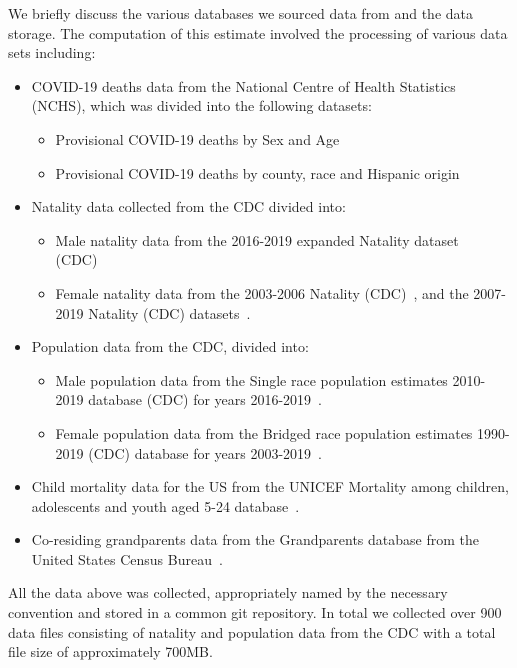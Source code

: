 \documentclass[11pt]{article}
\begin{document}
We briefly discuss the various databases we sourced data from and the data storage. The computation of this estimate involved the processing of various data sets including:
\begin{itemize}
    \item COVID-19 deaths data from the National Centre of Health Statistics (NCHS), which was divided into the following datasets:
    \begin{itemize}
        \item Provisional COVID-19 deaths by Sex and Age~\cite{COVID_19_Deaths_by_sex_and_age}
        \item Provisional COVID-19 deaths by county, race and Hispanic origin~\cite{COVID_19_Deaths_by_county_and_race}
    \end{itemize}
    \item Natality data collected from the CDC divided into:
    \begin{itemize}
        \item Male natality data from the 2016-2019 expanded Natality dataset (CDC)~\cite{Male_fertility_data}
        \item Female natality data from the 2003-2006 Natality (CDC)~\cite{Female_fertility_data_2003}, and the 2007-2019 Natality (CDC) datasets~\cite{Female_fertility_data_2019}.
    \end{itemize}
    \item Population data from the CDC, divided into:
    \begin{itemize}
        \item Male population data from the Single race population estimates 2010-2019 database (CDC) for years 2016-2019~\cite{Male_population_data}.
        \item Female population data from the Bridged race population estimates 1990-2019 (CDC) database for years 2003-2019~\cite{Female_population_data}.
    \end{itemize}
    \item Child mortality data for the US from the UNICEF Mortality among children, adolescents and youth aged 5-24 database~\cite{Child_Mortality_Data}.
    \item Co-residing grandparents data from the Grandparents database from the United States Census Bureau~\cite{grandparents_data}.
\end{itemize}
All the data above was collected, appropriately named by the necessary convention and stored in a common git repository. In total we collected over 900 data files consisting of natality and population data from the CDC with a total file size of approximately 700MB.
\end{document}
